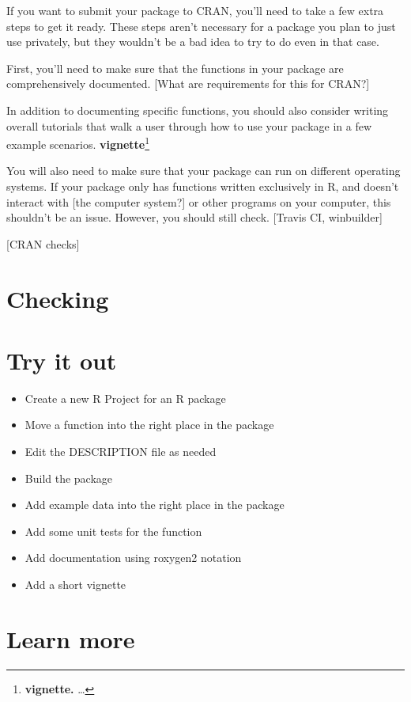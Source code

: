 \documentclass[]{tufte-book}
\providecommand{\tightlist}{%
  \setlength{\itemsep}{0pt}\setlength{\parskip}{0pt}}
\begin{document}
If you want to submit your package to CRAN, you'll need to take a few extra steps
to get it ready. These steps aren't necessary for a package you plan to just
use privately, but they wouldn't be a bad idea to try to do even in that case.

First, you'll need to make sure that the functions in your package are
comprehensively documented. {[}What are requirements for this for CRAN?{]}

In addition to documenting specific functions, you should also consider
writing overall tutorials that walk a user through how to use your
package in a few example scenarios. \textbf{vignette}\footnote{\textbf{vignette.} \ldots{}}

You will also need to make sure that your package can run on different
operating systems. If your package only has functions written exclusively
in R, and doesn't interact with {[}the computer system?{]} or other programs
on your computer, this shouldn't be an issue. However, you should still
check. {[}Travis CI, winbuilder{]}

{[}CRAN checks{]}

\hypertarget{checking}{%
\section{Checking}\label{checking}}

\hypertarget{try-it-out}{%
\section{Try it out}\label{try-it-out}}

\begin{itemize}
\tightlist
\item
  Create a new R Project for an R package
\item
  Move a function into the right place in the package
\item
  Edit the DESCRIPTION file as needed
\item
  Build the package
\item
  Add example data into the right place in the package
\item
  Add some unit tests for the function
\item
  Add documentation using roxygen2 notation
\item
  Add a short vignette
\end{itemize}

\hypertarget{learn-more-2}{%
\section{Learn more}\label{learn-more-2}}
\end{document}
